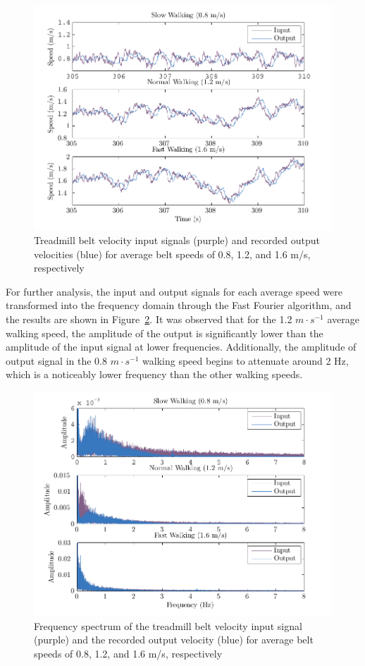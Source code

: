 \documentclass[10pt,a4paper,twocolumn]{article}
\begin{document}
\begin{figure}
  \centering
  \includegraphics{figures/input_vs_output.pdf}
  \caption{Treadmill belt velocity input signals (purple) and recorded output
    velocities (blue) for average belt speeds of 0.8, 1.2, and 1.6 m/s,
    respectively}
  \label{fig:input_output}
\end{figure}

For further analysis, the input and output signals for each average speed were
transformed into the frequency domain through the Fast Fourier algorithm, and
the results are shown in Figure~\ref{fig:freq_analysis}. It was observed that
for the 1.2 $m \cdot s^{-1}$ average walking speed, the amplitude of the output
is significantly lower than the amplitude of the input signal at lower
frequencies. Additionally, the amplitude of output signal in the 0.8 $m \cdot
s^{-1}$ walking speed begins to attenuate around 2 Hz, which is a noticeably
lower frequency than the other walking speeds.

\begin{figure}
  \centering
  \includegraphics{figures/frequency_analysis.pdf}
  \caption{Frequency spectrum of the treadmill belt velocity input signal
    (purple) and the recorded output velocity (blue) for average belt speeds of
    0.8, 1.2, and 1.6 m/s, respectively}
  \label{fig:freq_analysis}
\end{figure}
\end{document}
